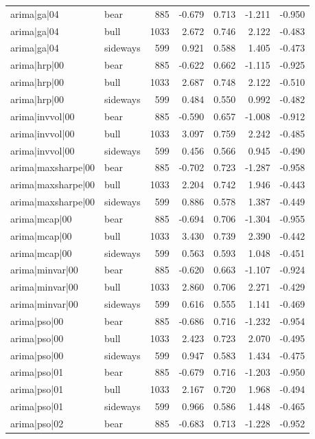\begin{table}
\begin{tabular}{llrrrrr}
arima|ga|04 & bear & 885 & -0.679 & 0.713 & -1.211 & -0.950 \\
arima|ga|04 & bull & 1033 & 2.672 & 0.746 & 2.122 & -0.483 \\
arima|ga|04 & sideways & 599 & 0.921 & 0.588 & 1.405 & -0.473 \\
arima|hrp|00 & bear & 885 & -0.622 & 0.662 & -1.115 & -0.925 \\
arima|hrp|00 & bull & 1033 & 2.687 & 0.748 & 2.122 & -0.510 \\
arima|hrp|00 & sideways & 599 & 0.484 & 0.550 & 0.992 & -0.482 \\
arima|invvol|00 & bear & 885 & -0.590 & 0.657 & -1.008 & -0.912 \\
arima|invvol|00 & bull & 1033 & 3.097 & 0.759 & 2.242 & -0.485 \\
arima|invvol|00 & sideways & 599 & 0.456 & 0.566 & 0.945 & -0.490 \\
arima|maxsharpe|00 & bear & 885 & -0.702 & 0.723 & -1.287 & -0.958 \\
arima|maxsharpe|00 & bull & 1033 & 2.204 & 0.742 & 1.946 & -0.443 \\
arima|maxsharpe|00 & sideways & 599 & 0.886 & 0.578 & 1.387 & -0.449 \\
arima|mcap|00 & bear & 885 & -0.694 & 0.706 & -1.304 & -0.955 \\
arima|mcap|00 & bull & 1033 & 3.430 & 0.739 & 2.390 & -0.442 \\
arima|mcap|00 & sideways & 599 & 0.563 & 0.593 & 1.048 & -0.451 \\
arima|minvar|00 & bear & 885 & -0.620 & 0.663 & -1.107 & -0.924 \\
arima|minvar|00 & bull & 1033 & 2.860 & 0.706 & 2.271 & -0.429 \\
arima|minvar|00 & sideways & 599 & 0.616 & 0.555 & 1.141 & -0.469 \\
arima|pso|00 & bear & 885 & -0.686 & 0.716 & -1.232 & -0.954 \\
arima|pso|00 & bull & 1033 & 2.423 & 0.723 & 2.070 & -0.495 \\
arima|pso|00 & sideways & 599 & 0.947 & 0.583 & 1.434 & -0.475 \\
arima|pso|01 & bear & 885 & -0.679 & 0.716 & -1.203 & -0.950 \\
arima|pso|01 & bull & 1033 & 2.167 & 0.720 & 1.968 & -0.494 \\
arima|pso|01 & sideways & 599 & 0.966 & 0.586 & 1.448 & -0.465 \\
arima|pso|02 & bear & 885 & -0.683 & 0.713 & -1.228 & -0.952 \\

\end{tabular}
\end{table}
